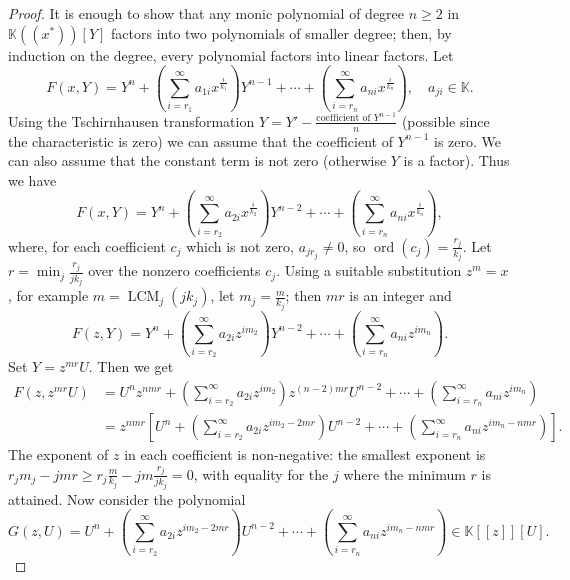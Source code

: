 \documentclass[11pt]{article}
\begin{document}
\begin{proof}
It is enough to show that any monic polynomial of degree $n \geq 2$ in $\mathbb{K}((x^*))[Y]$ factors into two polynomials of smaller degree; then, by induction on the degree, every polynomial factors into linear factors. Let
\[
F(x, Y) = Y^n + \left( \sum_{i=r_1}^\infty a_{1i} x^{\frac{i}{k_1}} \right) Y^{n-1} + \cdots + \left( \sum_{i=r_n}^\infty a_{ni} x^{\frac{i}{k_n}} \right), \quad a_{ji} \in \mathbb{K} .
\]
Using the Tschirnhausen transformation $Y = Y' - \frac{\text{coefficient of } Y^{n-1}}{n}$ (possible since the characteristic is zero) we can assume that the coefficient of $Y^{n-1}$ is zero. We can also assume that the constant term is not zero (otherwise $Y$ is a factor). Thus we have
\[
F(x, Y) = Y^n + \left( \sum_{i=r_2}^\infty a_{2i} x^{\frac{i}{k_2}} \right) Y^{n-2} + \cdots + \left( \sum_{i=r_n}^\infty a_{ni} x^{\frac{i}{k_n}} \right),
\]
where, for each coefficient $c_j$ which is not zero, $a_{jr_j} \neq 0$, so $\operatorname{ord}(c_j) = \frac{r_j}{k_j}$. Let $r = \min_j \frac{r_j}{j k_j}$ over the nonzero coefficients $c_j$. Using a suitable substitution $z^m = x$, for example $m = \operatorname{LCM}_{j}(j k_j)$, let $m_j = \frac{m}{k_j}$; then $mr$ is an integer and
\[
F(z, Y) = Y^n + \left( \sum_{i=r_2}^\infty a_{2i} z^{i m_2} \right) Y^{n-2} + \cdots + \left( \sum_{i=r_n}^\infty a_{ni} z^{i m_n} \right) .
\]
Set $Y = z^{mr} U$. Then we get
\[
\begin{aligned}
F(z, z^{mr}U) &= U^n z^{nmr} + \left( \sum_{i=r_2}^\infty a_{2i} z^{i m_2} \right) z^{(n-2)mr} U^{n-2} + \cdots + \left( \sum_{i=r_n}^\infty a_{ni} z^{i m_n} \right) \\
&= z^{nmr} \left[ U^n + \left( \sum_{i=r_2}^\infty a_{2i} z^{i m_2 - 2mr} \right) U^{n-2} + \cdots + \left( \sum_{i=r_n}^\infty a_{ni} z^{i m_n - nmr} \right) \right] .
\end{aligned}
\]
The exponent of $z$ in each coefficient is non-negative: the smallest exponent is $r_j m_j - jmr \geq r_j \frac{m}{k_j} - jm \frac{r_j}{j k_j} = 0$, with equality for the $j$ where the minimum $r$ is attained. Now consider the polynomial
\[
G(z, U) = U^n + \left( \sum_{i=r_2}^\infty a_{2i} z^{i m_2 - 2mr} \right) U^{n-2} + \cdots + \left( \sum_{i=r_n}^\infty a_{ni} z^{i m_n - nmr} \right) \in \mathbb{K}[[z]][U] .
\]

\end{proof}
\end{document}
